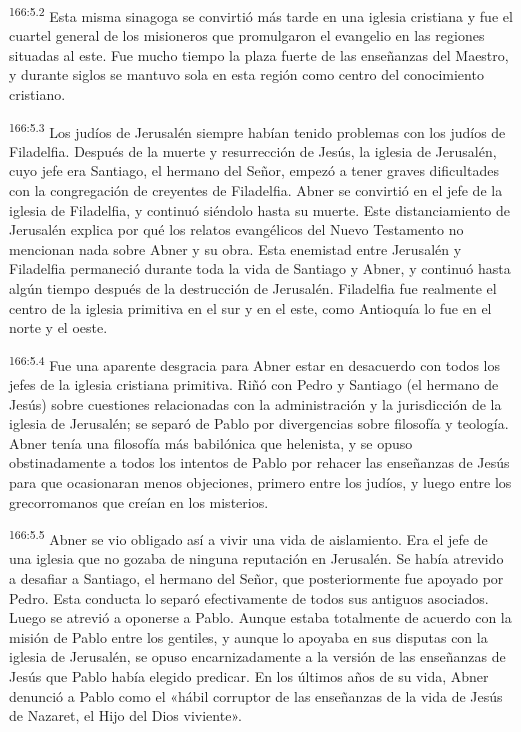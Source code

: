 \par 
\textsuperscript{166:5.2} Esta misma sinagoga se convirtió más tarde en una iglesia cristiana y fue el cuartel general de los misioneros que promulgaron el evangelio en las regiones situadas al este. Fue mucho tiempo la plaza fuerte de las enseñanzas del Maestro, y durante siglos se mantuvo sola en esta región como centro del conocimiento cristiano.

\par 
\textsuperscript{166:5.3} Los judíos de Jerusalén siempre habían tenido problemas con los judíos de Filadelfia. Después de la muerte y resurrección de Jesús, la iglesia de Jerusalén, cuyo jefe era Santiago, el hermano del Señor, empezó a tener graves dificultades con la congregación de creyentes de Filadelfia. Abner se convirtió en el jefe de la iglesia de Filadelfia, y continuó siéndolo hasta su muerte. Este distanciamiento de Jerusalén explica por qué los relatos evangélicos del Nuevo Testamento no mencionan nada sobre Abner y su obra. Esta enemistad entre Jerusalén y Filadelfia permaneció durante toda la vida de Santiago y Abner, y continuó hasta algún tiempo después de la destrucción de Jerusalén. Filadelfia fue realmente el centro de la iglesia primitiva en el sur y en el este, como Antioquía lo fue en el norte y el oeste.

\par 
\textsuperscript{166:5.4} Fue una aparente desgracia para Abner estar en desacuerdo con todos los jefes de la iglesia cristiana primitiva. Riñó con Pedro y Santiago (el hermano de Jesús) sobre cuestiones relacionadas con la administración y la jurisdicción de la iglesia de Jerusalén; se separó de Pablo por divergencias sobre filosofía y teología. Abner tenía una filosofía más babilónica que helenista, y se opuso obstinadamente a todos los intentos de Pablo por rehacer las enseñanzas de Jesús para que ocasionaran menos objeciones, primero entre los judíos, y luego entre los grecorromanos que creían en los misterios.

\par 
\textsuperscript{166:5.5} Abner se vio obligado así a vivir una vida de aislamiento. Era el jefe de una iglesia que no gozaba de ninguna reputación en Jerusalén. Se había atrevido a desafiar a Santiago, el hermano del Señor, que posteriormente fue apoyado por Pedro. Esta conducta lo separó efectivamente de todos sus antiguos asociados. Luego se atrevió a oponerse a Pablo. Aunque estaba totalmente de acuerdo con la misión de Pablo entre los gentiles, y aunque lo apoyaba en sus disputas con la iglesia de Jerusalén, se opuso encarnizadamente a la versión de las enseñanzas de Jesús que Pablo había elegido predicar. En los últimos años de su vida, Abner denunció a Pablo como el «hábil corruptor de las enseñanzas de la vida de Jesús de Nazaret, el Hijo del Dios viviente».

